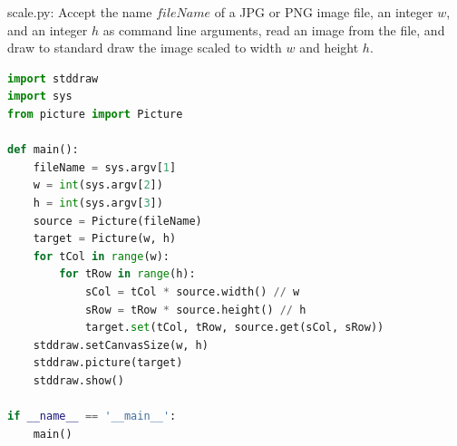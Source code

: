 \documentclass[8pt,a4paper,compress]{beamer}
\begin{document}
\begin{frame}[fragile]
\pause

\begin{framed}
\tiny scale.py: Accept the name $fileName$ of a JPG or PNG image file, an integer $w$, and an integer $h$ as command line arguments, read an image from the file, and draw to standard draw the image scaled to width $w$ and height $h$.
\end{framed}

\begin{lstlisting}[language=Python]
import stddraw
import sys
from picture import Picture

def main():
    fileName = sys.argv[1]
    w = int(sys.argv[2])
    h = int(sys.argv[3])
    source = Picture(fileName)
    target = Picture(w, h)
    for tCol in range(w):
        for tRow in range(h):
            sCol = tCol * source.width() // w
            sRow = tRow * source.height() // h
            target.set(tCol, tRow, source.get(sCol, sRow))
    stddraw.setCanvasSize(w, h)
    stddraw.picture(target)
    stddraw.show()

if __name__ == '__main__':
    main()
\end{lstlisting}
\end{frame}
\end{document}
